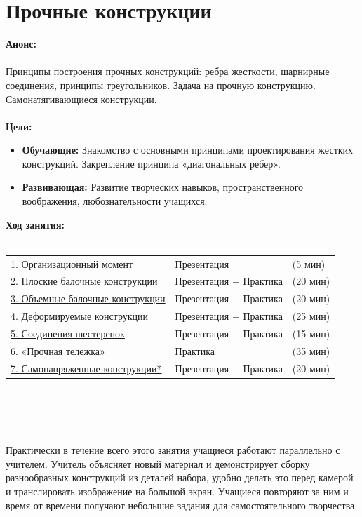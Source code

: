 \chapter{Прочные конструкции}
{\bfseries Анонс:}\\\\
Принципы построения прочных конструкций: ребра жесткости, шарнирные соединения, принципы треугольников. Задача на прочную конструкцию. Самонатягивающиеся конструкции.\\\\
{\bfseries Цели:}
\begin{itemize}
	\item{}{\bfseries Обучающие:} Знакомство с основными принципами проектирования жестких конструкций. Закрепление принципа «диагональных ребер».
	\item{}{\bfseries Развивающая:} Развитие творческих навыков, пространственного воображения, любознательности учащихся.\\
\end{itemize}	
{\bfseries Ход занятия:}\\\\
\begin{tabular}[h!]{lll}
	{\hyperlink{lesson19x1}{1. Организационный момент}}&{Презентация}&{(5 мин)}\\
	{\hyperlink{lesson19x2}{2. Плоские балочные конструкции}}&{Презентация + Практика}&{(20 мин)}\\
	{\hyperlink{lesson19x3}{3. Объемные балочные конструкции}}&{Презентация + Практика}&{(20 мин)}\\
	{\hyperlink{lesson19x4}{4. Деформируемые конструкции}}&{Презентация + Практика}&{(25 мин)}\\
	{\hyperlink{lesson19x5}{5. Соединения шестеренок}}&{Презентация + Практика}&{(15 мин)}\\
	{\hyperlink{lesson19x6}{6. «Прочная тележка»}}&{Практика}&{(35 мин)}\\
	{\hyperlink{lesson19x7}{7. Самонапряженные конструкции*}}&{Презентация + Практика}&{(20 мин)}\\
\end{tabular}\\\\

{\hypertarget{lesson19x1}{}}\\\\	

Практически в течение всего этого занятия учащиеся работают параллельно с учителем. Учитель объясняет новый материал и демонстрирует сборку разнообразных конструкций из деталей набора, удобно делать это перед камерой и транслировать изображение на большой экран. Учащиеся повторяют за ним и время от времени получают небольшие задания для самостоятельного творчества.

